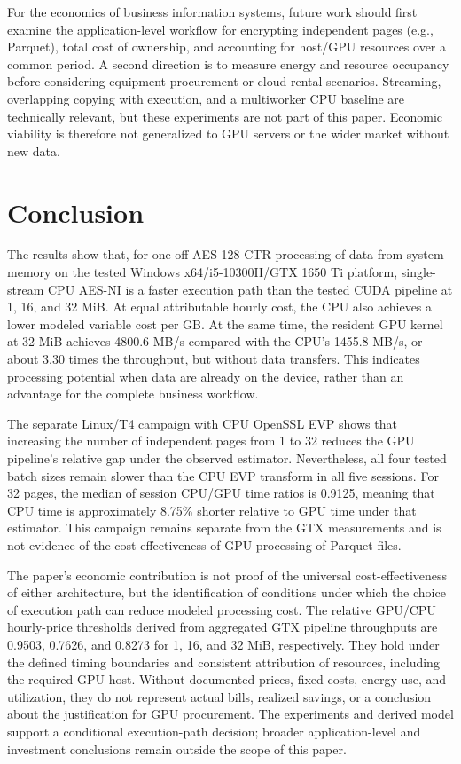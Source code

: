 \documentclass[11pt,b5paper]{article}
\begin{document}
For the economics of business information systems, future work should first examine the application-level workflow for encrypting independent pages (e.g., Parquet), total cost of ownership, and accounting for host/GPU resources over a common period. A second direction is to measure energy and resource occupancy before considering equipment-procurement or cloud-rental scenarios. Streaming, overlapping copying with execution, and a multiworker CPU baseline are technically relevant, but these experiments are not part of this paper. Economic viability is therefore not generalized to GPU servers or the wider market without new data.\par


\section{Conclusion}
The results show that, for one-off AES-128-CTR processing of data from system memory on the tested Windows x64/i5-10300H/GTX 1650 Ti platform, single-stream CPU AES-NI is a faster execution path than the tested CUDA pipeline at 1, 16, and 32 MiB. At equal attributable hourly cost, the CPU also achieves a lower modeled variable cost per GB. At the same time, the resident GPU kernel at 32 MiB achieves 4800.6 MB/s compared with the CPU's 1455.8 MB/s, or about 3.30 times the throughput, but without data transfers. This indicates processing potential when data are already on the device, rather than an advantage for the complete business workflow.\par
The separate Linux/T4 campaign with CPU OpenSSL EVP shows that increasing the number of independent pages from 1 to 32 reduces the GPU pipeline's relative gap under the observed estimator. Nevertheless, all four tested batch sizes remain slower than the CPU EVP transform in all five sessions. For 32 pages, the median of session CPU/GPU time ratios is 0.9125, meaning that CPU time is approximately 8.75\% shorter relative to GPU time under that estimator. This campaign remains separate from the GTX measurements and is not evidence of the cost-effectiveness of GPU processing of Parquet files.\par
The paper's economic contribution is not proof of the universal cost-effectiveness of either architecture, but the identification of conditions under which the choice of execution path can reduce modeled processing cost. The relative GPU/CPU hourly-price thresholds derived from aggregated GTX pipeline throughputs are 0.9503, 0.7626, and 0.8273 for 1, 16, and 32 MiB, respectively. They hold under the defined timing boundaries and consistent attribution of resources, including the required GPU host. Without documented prices, fixed costs, energy use, and utilization, they do not represent actual bills, realized savings, or a conclusion about the justification for GPU procurement. The experiments and derived model support a conditional execution-path decision; broader application-level and investment conclusions remain outside the scope of this paper.
\end{document}
